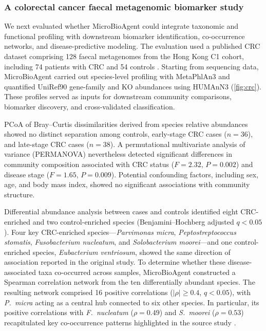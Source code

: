 \documentclass[10pt,letterpaper]{article}
\begin{document}
\FloatBarrier

\subsubsection{A colorectal cancer faecal metagenomic biomarker study}
\label{sec:case-crc}

We next evaluated whether MicroBioAgent could integrate taxonomic and functional
profiling with downstream biomarker identification, co-occurrence networks, and
disease-predictive modeling.  The evaluation used a published CRC dataset
comprising 128 faecal metagenomes from the Hong Kong C1 cohort,
including 74 patients with CRC and 54 controls \parencite{yu2017crc}.
Starting from sequencing data, MicroBioAgent carried out species-level
profiling with MetaPhlAn3 and quantified UniRef90 gene-family and KO abundances
using HUMAnN3 (\cref{fig:crc})\parencite{beghini2021biobakery}.  These profiles served as inputs
for downstream community comparisons, biomarker discovery, and cross-validated
classification.

PCoA of Bray--Curtis dissimilarities derived from
species relative abundances showed no distinct separation among controls,
early-stage CRC cases ($n=36$), and late-stage CRC cases ($n=38$).  A
permutational multivariate analysis of variance (PERMANOVA) nevertheless
detected significant differences in community composition
associated with CRC status ($F=2.32$, $P=0.002$) and disease stage ($F=1.65$,
$P=0.009$)\parencite{anderson2001permanova}.  Potential confounding factors, including sex, age, and body mass
index, showed
no significant associations with community structure.

Differential abundance analysis between cases and controls identified eight
CRC-enriched and two control-enriched species (Benjamini--Hochberg adjusted
$q<0.05$).  Four key CRC-enriched species---\textit{Parvimonas micra},
\textit{Peptostreptococcus stomatis}, \textit{Fusobacterium nucleatum}, and
\textit{Solobacterium moorei}---and one control-enriched species,
\textit{Eubacterium ventriosum}, showed the same direction of association
reported in the original study.  To determine whether these disease-associated
taxa co-occurred across samples, MicroBioAgent constructed a Spearman
correlation network from the ten differentially abundant species.  The resulting
network comprised 16 positive correlations ($|\rho|\geq0.4$, $q<0.05$), with
\textit{P.~micra} acting as a central hub connected to six other species.  In
particular, its positive correlations with \textit{F.~nucleatum} ($\rho=0.49$)
and \textit{S.~moorei} ($\rho=0.53$) recapitulated key co-occurrence patterns
highlighted in the source study \parencite{yu2017crc}.
\end{document}
